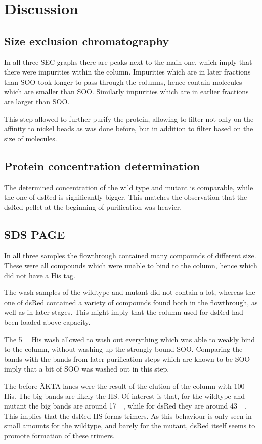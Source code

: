 \chapter{Discussion}

\section{Size exclusion chromatography}

In all three SEC graphs there are peaks next to the main one, which imply that
there were impurities within the column. Impurities which are in later
fractions than SOO took longer to pass through the columns, hence contain
molecules which are smaller than SOO. Similarly impurities which are in earlier
fractions are larger than SOO.

This step allowed to further purify the protein, allowing to filter not only on
the affinity to nickel beads as was done before, but in addition to filter
based on the size of molecules.

\section{Protein concentration determination}

The determined concentration of the wild type and mutant is comparable, while
the one of dsRed is significantly bigger. This matches the observation that the
dsRed pellet at the beginning of purification was heavier.

\section{SDS PAGE}

In all three samples the flowthrough contained many compounds of different
size. These were all compounds which were unable to bind to the column, hence
which did not have a His tag.

The wash samples of the wildtype and mutant did not contain a lot, whereas the
one of dsRed contained a variety of compounds found both in the flowthrough, as
well as in later stages. This might imply that the column used for dsRed had
been loaded above capacity.

The \SI{5}{\milli\Molar} His wash allowed to wash out everything which was able
to weakly bind to the column, without washing up the strongly bound SOO.
Comparing the bands with the bands from later purification steps which are
known to be SOO imply that a bit of SOO was washed out in this step.

The before ÄKTA lanes were the result of the elution of the column with
\SI{100}{\milli\Molar} His. The big bands are likely the HS. Of interest is
that, for the wildtype and mutant the big bands are around \SI{17}{\kilo\Da},
while for dsRed they are around \SI{43}{\kilo\Da}. This implies that the dsRed
HS forms trimers. As this behaviour is only seen in small amounts for the
wildtype, and barely for the mutant, dsRed itself seems to promote formation of
these trimers.
